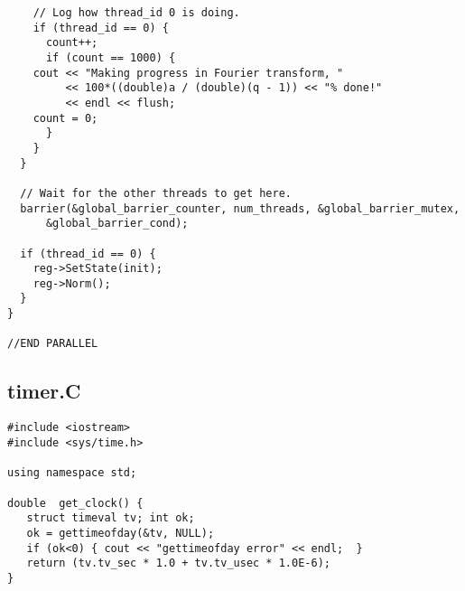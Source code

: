 \documentclass[]{article}
\begin{document}
\begin{verbatim}
    // Log how thread_id 0 is doing.
    if (thread_id == 0) {
      count++;
      if (count == 1000) {
	cout << "Making progress in Fourier transform, " 
	     << 100*((double)a / (double)(q - 1)) << "% done!" 
	     << endl << flush;
	count = 0;
      }
    }
  }
  
  // Wait for the other threads to get here.
  barrier(&global_barrier_counter, num_threads, &global_barrier_mutex, 
	  &global_barrier_cond);

  if (thread_id == 0) {
    reg->SetState(init);
    reg->Norm();
  }
}

//END PARALLEL
\end{verbatim}

\subsection{timer.C}
\begin{verbatim}
#include <iostream>
#include <sys/time.h>

using namespace std;

double  get_clock() {
   struct timeval tv; int ok;
   ok = gettimeofday(&tv, NULL);
   if (ok<0) { cout << "gettimeofday error" << endl;  }
   return (tv.tv_sec * 1.0 + tv.tv_usec * 1.0E-6);
}
\end{verbatim}
\end{document}
